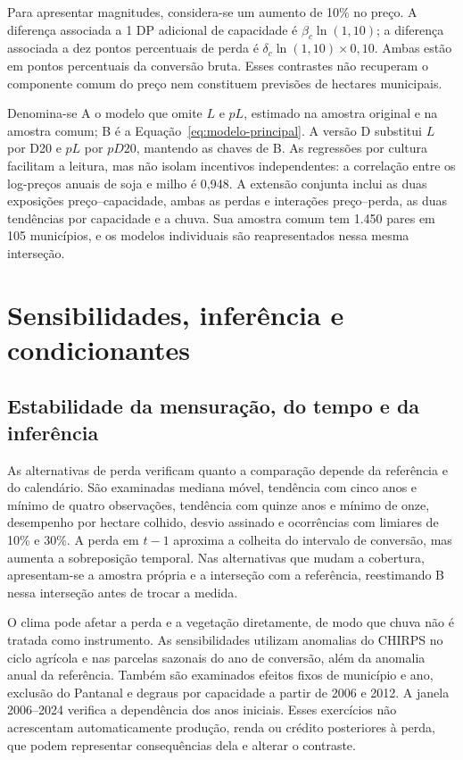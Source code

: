 Para apresentar magnitudes, considera-se um aumento de 10\% no preço. A diferença associada a 1 DP adicional de capacidade é $\beta_c\ln(1{,}10)$; a diferença associada a dez pontos percentuais de perda é $\delta_c\ln(1{,}10)\times0{,}10$. Ambas estão em pontos percentuais da conversão bruta. Esses contrastes não recuperam o componente comum do preço nem constituem previsões de hectares municipais.

Denomina-se A o modelo que omite $L$ e $pL$, estimado na amostra original e na amostra comum; B é a Equação~\eqref{eq:modelo-principal}. A versão D substitui $L$ por D20 e $pL$ por $pD20$, mantendo as chaves de B. As regressões por cultura facilitam a leitura, mas não isolam incentivos independentes: a correlação entre os log-preços anuais de soja e milho é 0,948. A extensão conjunta inclui as duas exposições preço--capacidade, ambas as perdas e interações preço--perda, as duas tendências por capacidade e a chuva. Sua amostra comum tem 1.450 pares em 105 municípios, e os modelos individuais são reapresentados nessa mesma interseção.



\section{Sensibilidades, inferência e condicionantes}
\label{text:s4}
\subsection{Estabilidade da mensuração, do tempo e da inferência}
\label{estrategia-inferencia}

As alternativas de perda verificam quanto a comparação depende da referência e do calendário. São examinadas mediana móvel, tendência com cinco anos e mínimo de quatro observações, tendência com quinze anos e mínimo de onze, desempenho por hectare colhido, desvio assinado e ocorrências com limiares de 10\% e 30\%. A perda em $t-1$ aproxima a colheita do intervalo de conversão, mas aumenta a sobreposição temporal. Nas alternativas que mudam a cobertura, apresentam-se a amostra própria e a interseção com a referência, reestimando B nessa interseção antes de trocar a medida.

O clima pode afetar a perda e a vegetação diretamente, de modo que chuva não é tratada como instrumento. As sensibilidades utilizam anomalias do CHIRPS no ciclo agrícola e nas parcelas sazonais do ano de conversão, além da anomalia anual da referência. Também são examinados efeitos fixos de município e ano, exclusão do Pantanal e degraus por capacidade a partir de 2006 e 2012. A janela 2006--2024 verifica a dependência dos anos iniciais. Esses exercícios não acrescentam automaticamente produção, renda ou crédito posteriores à perda, que podem representar consequências dela e alterar o contraste.


